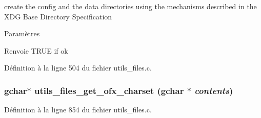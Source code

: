 create the config and the data directories using the mechanisms described in the XDG Base Directory Specification 


\begin{DoxyParams}{Paramètres}
\item[{\em }]\end{DoxyParams}
\begin{DoxyReturn}{Renvoie}
TRUE if ok 
\end{DoxyReturn}


Définition à la ligne 504 du fichier utils\_\-files.c.

\subsubsection[{utils\_\-files\_\-get\_\-ofx\_\-charset}]{\setlength{\rightskip}{0pt plus 5cm}gchar$\ast$ utils\_\-files\_\-get\_\-ofx\_\-charset (gchar $\ast$ {\em contents})}\label{utils__files_8h_ac9835d1064eac1edc68310b67ec5c249}


Définition à la ligne 854 du fichier utils\_\-files.c.


